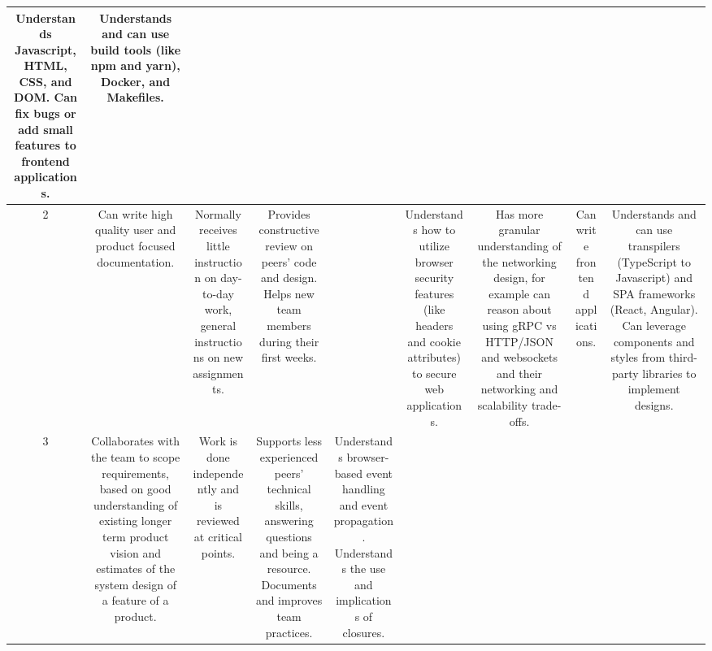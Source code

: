 \documentclass{article}
\begin{document}
{\begin{center}
\begin{tabular}{|C|C|C|C|C|C|C|C|C|}
    Understands Javascript, HTML, CSS, and DOM. Can fix bugs or add small
    features to frontend applications.
    &

    Understands and can use build tools (like npm and yarn), Docker, and
    Makefiles.
    \\ [13em]
  \hline
    2
    &

    Can write high quality user and product focused documentation.
    &

    Normally receives little instruction on day-to-day work, general instructions
    on new assignments.
    &

    Provides constructive review on peers' code and design. Helps new team
    members during their first weeks.
    &

    &

    Understands how to utilize browser security features (like headers and
    cookie attributes) to secure web applications.
    &

    Has more granular understanding of the networking design, for example can
    reason about using gRPC vs HTTP/JSON and websockets and their networking
    and scalability trade-offs.
    &

    Can write frontend applications.
    &

    Understands and can use transpilers (TypeScript to Javascript) and SPA
    frameworks (React, Angular). Can leverage components and styles from
    third-party libraries to implement designs.
    \\ [13em]
  \hline
    3
    &

    Collaborates with the team to scope requirements, based on good
    understanding of existing longer term product vision and estimates of the
    system design of a feature of a product.
    &

    Work is done independently and is reviewed at critical points.
    &

    Supports less experienced peers' technical skills, answering questions and
    being a resource. Documents and improves team practices.
    &

    Understands browser-based event handling and event propagation.
    Understands the use and implications of closures.
    &


\end{tabular}
\end{center}}
\end{document}
